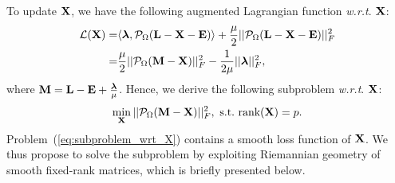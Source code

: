 \documentclass[10pt,twocolumn,letterpaper]{article}
\def\calP{\mathcal{P}}
\def\bM{{\bf M}}
\def\bE{{\bf E}}
\def\blambda{{\bm \lambda}}
\def\calL{{\mathcal{L}}}
\def\bL{{\bf L}}
\def\bX{{\bf X}}
\def\bX{{\bf X}}
\def\st{{\text{s.t.}}}
\def\wrt{\emph{w.r.t}}
\def\rank{{\text{rank}}}
\begin{document}
To update $\bX$, we have the following augmented Lagrangian function \wrt. $\bX$:
{
\begin{align}\label{eq:langrangian_wrt_X}
  \calL (\bX) = & \langle \blambda, \calP_{\Omega} (\bL - \bX - \bE) \rangle + \frac{\mu}{2} || \calP_{\Omega} (\bL - \bX - \bE) ||_F^2  \nonumber  \\
              = & \frac{\mu}{2} || \calP_{\Omega} (\bM - \bX) ||_F^2 - \frac{1}{2\mu}|| \blambda ||_F^2   ,
\end{align}
}
\noindent
where $\bM = \bL - \bE + \frac{\blambda}{\mu}$.
Hence, we derive the following subproblem \wrt. $\bX$:
{
\begin{align}\label{eq:subproblem_wrt_X}
  \min_{\bX} || \calP_{\Omega} (\bM - \bX) ||_F^2,~ \st~ \rank(\bX) = p.
\end{align}
}
\noindent
Problem~(\ref{eq:subproblem_wrt_X}) contains a smooth loss function of $\bX$.
We thus propose to solve the subproblem by exploiting Riemannian geometry of smooth fixed-rank matrices, which is briefly presented below.
\end{document}
